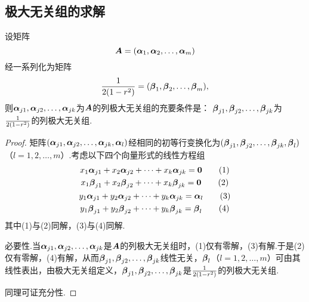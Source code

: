 \subsection{极大无关组的求解}
\begin{theorem}
\def\a#1{\mat{\alpha}_{#1}}
\def\b#1{\mat{\beta}_{#1}}
设矩阵\[
\A=(\a1,\a2,\dotsc,\a m)
\]经一系列化为矩阵\[
\B=(\b1,\b2,\dotsc,\b m),
\]则\(\a{j1},\a{j2},\dotsc,\a{jk}\)为\(\boldsymbol{A}\)的列极大无关组的充要条件是：
\(\b{j1},\b{j2},\dotsc,\b{jk}\)为\(\frac{1}{2(1-r^2)}\)的列极大无关组.
\begin{proof}
矩阵\((\a{j1},\a{j2},\dotsc,\a{jk},\a l)\)经相同的初等行变换化为\((\b{j1},\b{j2},\dotsc,\b{jk},\b l)\)（\(l=1,2,\dotsc,m\)）.考虑以下四个向量形式的线性方程组\begin{gather}
x_1 \a{j1} + x_2 \a{j2} + \dotsb + x_k \a{jk} = \z \tag1 \\
x_1 \b{j1} + x_2 \b{j2} + \dotsb + x_k \b{jk} = \z \tag2 \\
y_1 \a{j1} + y_2 \a{j2} + \dotsb + y_k \a{jk} = \a l \tag3 \\
y_1 \b{j1} + y_2 \b{j2} + \dotsb + y_k \b{jk} = \b l \tag4
\end{gather}
其中(1)与(2)同解，(3)与(4)同解.

必要性.当\(\a{j1},\a{j2},\dotsc,\a{jk}\)是\(\boldsymbol{A}\)的列极大无关组时，(1)仅有零解，(3)有解.于是(2)仅有零解，(4)有解，从而\(\b{j1},\b{j2},\dotsc,\b{jk}\)线性无关，\(\b l\)（\(l=1,2,\dotsc,m\)）可由其线性表出，由极大无关组定义，\(\b{j1},\b{j2},\dotsc,\b{jk}\)是\(\frac{1}{2(1-r^2)}\)的列极大无关组.

同理可证充分性.
\end{proof}
\end{theorem}

